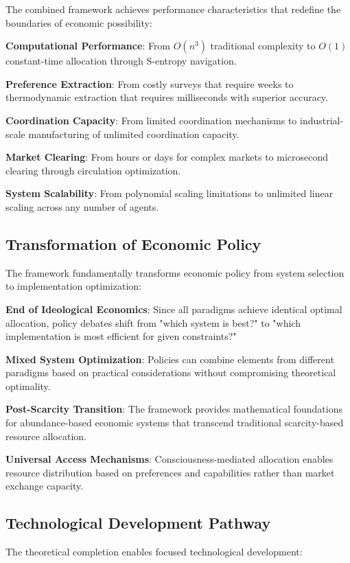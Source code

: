 \documentclass[12pt,a4paper]{article}
\begin{document}
The combined framework achieves performance characteristics that redefine the boundaries of economic possibility:

\textbf{Computational Performance}: From $O(n^3)$ traditional complexity to $O(1)$ constant-time allocation through S-entropy navigation.

\textbf{Preference Extraction}: From costly surveys that require weeks to thermodynamic extraction that requires milliseconds with superior accuracy.

\textbf{Coordination Capacity}: From limited coordination mechanisms to industrial-scale manufacturing of unlimited coordination capacity.

\textbf{Market Clearing}: From hours or days for complex markets to microsecond clearing through circulation optimization.

\textbf{System Scalability}: From polynomial scaling limitations to unlimited linear scaling across any number of agents.

\subsection{Transformation of Economic Policy}

The framework fundamentally transforms economic policy from system selection to implementation optimization:

\textbf{End of Ideological Economics}: Since all paradigms achieve identical optimal allocation, policy debates shift from "which system is best?" to "which implementation is most efficient for given constraints?"

\textbf{Mixed System Optimization}: Policies can combine elements from different paradigms based on practical considerations without compromising theoretical optimality.

\textbf{Post-Scarcity Transition}: The framework provides mathematical foundations for abundance-based economic systems that transcend traditional scarcity-based resource allocation.

\textbf{Universal Access Mechanisms}: Consciousness-mediated allocation enables resource distribution based on preferences and capabilities rather than market exchange capacity.

\subsection{Technological Development Pathway}

The theoretical completion enables focused technological development:
\end{document}
